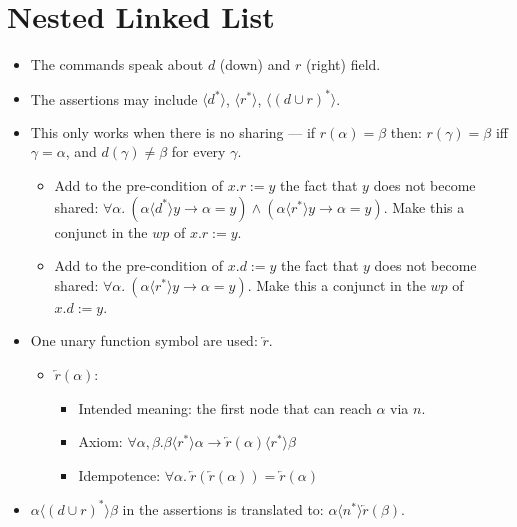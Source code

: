 \documentclass[11pt,a4paper,oneside,draft]{article}
\theoremstyle{definition}
\theoremstyle{remark}
\newcommand{\tup}[1]{{\langle #1 \rangle}}
\begin{document}
\section{Nested Linked List}

\begin{itemize}

\item The commands speak about $d$ (down) and $r$ (right) field.
\item The assertions may include $\tup{d^*}$, $\tup{r^*}$, $\tup{(d\cup r)^*}$.

\item This only works when there is no sharing ---
if $r(\alpha)=\beta$ then: $r(\gamma)=\beta$ iff $\gamma=\alpha$, and $d(\gamma)\neq\beta$ for every $\gamma$.
\begin{itemize}
\item Add to the pre-condition of $x.r := y$ the fact that $y$ does not become shared:
$\forall \alpha. ~ (\alpha \tup{d^*} y \to \alpha=y) \land (\alpha \tup{r^*} y \to \alpha=y)$. 
Make this a conjunct in the $wp$ of $x.r := y$.

\item Add to the pre-condition of $x.d := y$ the fact that $y$ does not become shared:
$\forall \alpha. ~ (\alpha \tup{r^*} y \to \alpha=y)$. 
Make this a conjunct in the $wp$ of $x.d := y$.

\end{itemize}

\item One unary function symbol are used: $\overleftarrow{r}$.
\begin{itemize}
\item $\overleftarrow{r}(\alpha)$: 
\begin{itemize}
\item Intended meaning: the first node that can reach $ \alpha$ via $n$.
\item Axiom: $\forall \alpha,\beta. \beta \tup{r^*} \alpha \to \overleftarrow{r}(\alpha) \tup{r^*} \beta$
\item Idempotence: $\forall \alpha.~\overleftarrow{r}(\overleftarrow{r}(\alpha))=\overleftarrow{r}(\alpha)$ 
\end{itemize}


\end{itemize}

\item $\alpha \tup{(d\cup r)^*} \beta$ in the assertions is translated to: $\alpha \tup{n^*} \overleftarrow{r}(\beta)$.



\end{itemize}
\end{document}
